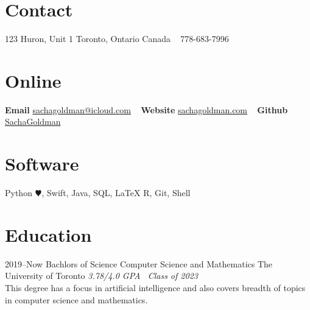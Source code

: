 \documentclass[]{style}
\begin{document}


\begin{aside} %
\section{Contact}
123 Huron, Unit 1
Toronto, Ontario
Canada 
~ \vspace{-2mm}
778-683-7996
\section{Online}
\textbf{Email}
\href{mailto:sachagoldman@icloud.com}{sachagoldman@icloud.com} 
~ \vspace{-2mm}
\textbf{Website} 
\href{https://sachagoldman.com}{sachagoldman.com} 
~ \vspace{-2mm}
\textbf{Github}
\href{https://github.com/SachaGoldman}{SachaGoldman}
\section{Software}
Python {\color{red} $\varheartsuit$}, Swift,
Java, SQL, LaTeX
R, Git, Shell
\end{aside}


\section{Education}

\begin{entrylist}


\entry
{2019–Now}
{Bachlors of Science {\normalfont Computer Science and Mathematics}}
{The University of Toronto}
{\emph{3.78/4.0 GPA \ Class of 2023} \\ This degree has a focus in artificial intelligence and also covers breadth of topics in computer science and mathematics.}


\end{entrylist}
\end{document}
